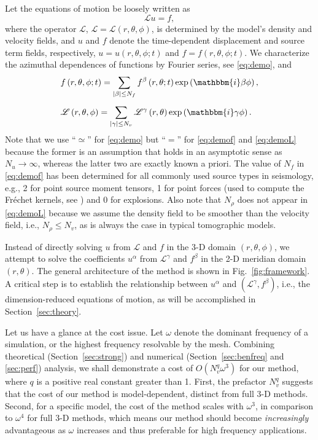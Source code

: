 \documentclass[extra,referee]{gji}
\begin{document}
Let the equations of motion be loosely written as 
\begin{equation}
  \mathscr{L}u=f,
  \label{eq:eomloose}
\end{equation}
where the operator $\mathscr{L}$, $\mathscr{L}=\mathscr{L}\left(r,\theta,\phi\right)$, 
is determined by the model's density and velocity fields, and $u$ and $f$
denote the time-dependent displacement and source term fields, respectively,
$u=u\left(r,\theta,\phi;t\right)$ and $f=f\left(r,\theta,\phi;t\right)$. 
We characterize the azimuthal dependences of functions
by Fourier series, see \eqref{eq:demo}, and 
\begin{align}
  & f\left(r,\theta,\phi;t\right)=\sum_{|\beta| \le N_f} 
  f^\beta\left(r,\theta;t\right)\exp\left(\mathbbm{i}\beta\phi\right),
  \label{eq:demof}\\[.5em]
  & \mathscr{L}\left(r,\theta,\phi\right)=\sum_{|\gamma| \le N_v} 
  \mathscr{L}^\gamma\left(r,\theta\right)\exp\left(\mathbbm{i}\gamma\phi\right).  
  \label{eq:demoL}
\end{align}
Note that we use ``$\simeq$'' for \eqref{eq:demo} but ``$=$'' for 
\eqref{eq:demof} and \eqref{eq:demoL} because the former is an 
assumption that holds in an asymptotic sense as $N_u\rightarrow\infty$,
whereas the latter two are exactly known a priori.  
The value of $N_f$ in \eqref{eq:demof} has been determined for all 
commonly used source types in seismology, e.g., 
2 for point source moment tensors, 
1 for point forces (used to compute the Fr\'echet kernels, 
see \cite{nissen2007axisem}) and 0 for explosions. 
Also note that $N_\rho$ does not appear in \eqref{eq:demoL} because we 
assume the density field to be smoother than the velocity field, i.e., 
$N_\rho \le N_v$, as is always the case in typical tomographic models. 

Instead of directly solving $u$ from $\mathscr{L}$ and $f$ in the 3-D
domain $\left(r,\theta,\phi\right)$, we attempt to solve the coefficients $u^\alpha$ from 
$\mathscr{L}^\gamma$ and $f^\beta$ in the 2-D meridian domain $\left(r,\theta\right)$. 
The general architecture of the method is shown in Fig.~\ref{fig:framework}. A 
critical step is to establish the relationship between $u^\alpha$ and
$\left(\mathscr{L}^\gamma,f^\beta\right)$, i.e., the dimension-reduced
equations of motion, as will be accomplished in Section~\ref{sec:theory}.


Let us have a glance at the cost issue.
Let $\omega$ denote the dominant frequency of a simulation, or the highest 
frequency resolvable by the mesh. 
Combining theoretical (Section~\ref{sec:strong}) and numerical 
(Section~\ref{sec:benfreq} and \ref{sec:perf}) analysis, we shall demonstrate 
a cost of $O\left(N_v^q\omega^3\right)$ for our method, where 
$q$ is a positive real constant greater than 1.
First, the prefactor $N_v^q$ suggests that the cost of our method is 
model-dependent, distinct from full 3-D methods. 
Second, for a specific model, 
the cost of the method scales with $\omega^3$,
in comparison to $\omega^4$ for full 3-D methods,
which means our method should become \textit{increasingly} 
advantageous as $\omega$ increases and thus preferable for high 
frequency applications.  
\end{document}
